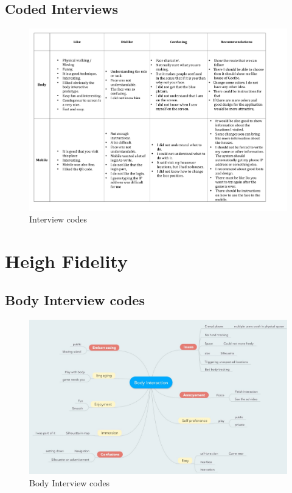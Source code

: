 \begin{appendices}
\section{Coded Interviews}
\begin{figure}[H]
 \centering 
    \includegraphics[width=\textwidth]{Appendices/5/Coded_Interview.pdf}
    \caption{Interview codes}
     \label{app:coded_interview}%
\end{figure}


\newpage
\chapter{Heigh Fidelity}

\setcounter{figure}{0}
\setcounter{table}{0}

\section{Body Interview codes}
\begin{minipage}{1.14\textwidth}
\begin{flushleft} 
\begin{figure}[H]
 \centering 
    \includegraphics[width = \textwidth, height=0.8\textheight]{Appendices/6/Body_Interaction.pdf}
    \caption{Body Interview codes}
     \label{app:bodyinterviewcodes_}%
\end{figure}
\end{flushleft} 
\end{minipage}



\end{appendices}
